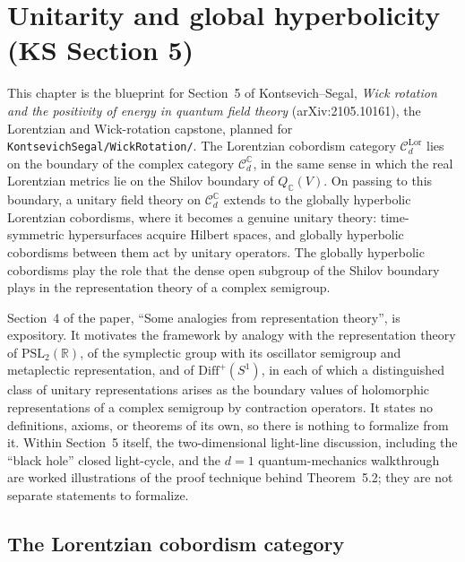 \chapter{Unitarity and global hyperbolicity (KS Section 5)}

This chapter is the blueprint for Section~5 of Kontsevich--Segal,
\emph{Wick rotation and the positivity of energy in quantum field theory}
(arXiv:2105.10161), the Lorentzian and Wick-rotation capstone, planned for
\texttt{KontsevichSegal/WickRotation/}. The Lorentzian cobordism category
$\mathcal C_d^{\mathrm{Lor}}$ lies on the boundary of the complex category
$\mathcal C_d^{\mathbb C}$, in the same sense in which the real Lorentzian metrics
lie on the Shilov boundary of $Q_{\mathbb C}(V)$. On passing to this boundary, a
unitary field theory on $\mathcal C_d^{\mathbb C}$ extends to the globally
hyperbolic Lorentzian cobordisms, where it becomes a genuine unitary theory:
time-symmetric hypersurfaces acquire Hilbert spaces, and globally hyperbolic
cobordisms between them act by unitary operators. The globally hyperbolic
cobordisms play the role that the dense open subgroup of the Shilov boundary
plays in the representation theory of a complex semigroup.

Section~4 of the paper, ``Some analogies from representation theory'', is
expository. It motivates the framework by analogy with the representation theory
of $\mathrm{PSL}_2(\mathbb R)$, of the symplectic group with its oscillator
semigroup and metaplectic representation, and of $\mathrm{Diff}^+(S^1)$, in each
of which a distinguished class of unitary representations arises as the boundary
values of holomorphic representations of a complex semigroup by contraction
operators. It states no definitions, axioms, or theorems of its own, so there is
nothing to formalize from it. Within Section~5 itself, the two-dimensional
light-line discussion, including the ``black hole'' closed light-cycle, and the
$d=1$ quantum-mechanics walkthrough are worked illustrations of the proof
technique behind Theorem~5.2; they are not separate statements to formalize.

\section{The Lorentzian cobordism category}

